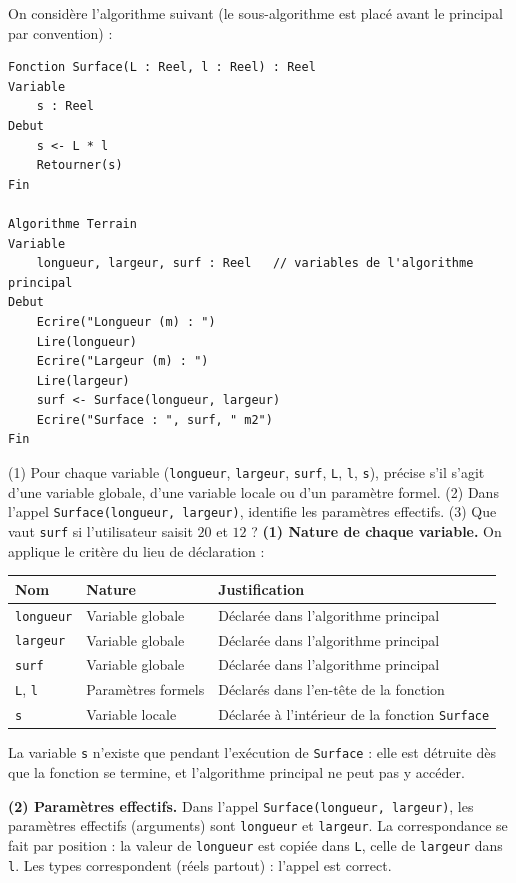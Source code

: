 \documentclass[11pt]{article}
\begin{document}
\begin{exoresolu}
On considère l'algorithme suivant (le sous-algorithme est placé avant le principal par convention) :
\begin{lstlisting}
Fonction Surface(L : Reel, l : Reel) : Reel
Variable
    s : Reel
Debut
    s <- L * l
    Retourner(s)
Fin

Algorithme Terrain
Variable
    longueur, largeur, surf : Reel   // variables de l'algorithme principal
Debut
    Ecrire("Longueur (m) : ")
    Lire(longueur)
    Ecrire("Largeur (m) : ")
    Lire(largeur)
    surf <- Surface(longueur, largeur)
    Ecrire("Surface : ", surf, " m2")
Fin
\end{lstlisting}
(1) Pour chaque variable (\texttt{longueur}, \texttt{largeur}, \texttt{surf}, \texttt{L}, \texttt{l}, \texttt{s}), précise s'il s'agit d'une variable globale, d'une variable locale ou d'un paramètre formel. (2) Dans l'appel \texttt{Surface(longueur, largeur)}, identifie les paramètres effectifs. (3) Que vaut \texttt{surf} si l'utilisateur saisit $20$ et $12$ ?
\tcblower
\textbf{(1) Nature de chaque variable.} On applique le critère du lieu de déclaration :
\begin{center}
\begin{tabularx}{\linewidth}{|l|l|X|}
\hline
\rowcolor{popblueL} \textbf{Nom} & \textbf{Nature} & \textbf{Justification} \\
\hline
\texttt{longueur} & Variable globale & Déclarée dans l'algorithme principal \\
\hline
\texttt{largeur} & Variable globale & Déclarée dans l'algorithme principal \\
\hline
\texttt{surf} & Variable globale & Déclarée dans l'algorithme principal \\
\hline
\texttt{L}, \texttt{l} & Paramètres formels & Déclarés dans l'en-tête de la fonction \\
\hline
\texttt{s} & Variable locale & Déclarée à l'intérieur de la fonction \texttt{Surface} \\
\hline
\end{tabularx}
\end{center}
La variable \texttt{s} n'existe que pendant l'exécution de \texttt{Surface} : elle est détruite dès que la fonction se termine, et l'algorithme principal ne peut pas y accéder.

\textbf{(2) Paramètres effectifs.} Dans l'appel \texttt{Surface(longueur, largeur)}, les paramètres effectifs (arguments) sont \texttt{longueur} et \texttt{largeur}. La correspondance se fait par position : la valeur de \texttt{longueur} est copiée dans \texttt{L}, celle de \texttt{largeur} dans \texttt{l}. Les types correspondent (réels partout) : l'appel est correct.


\end{exoresolu}
\end{document}
